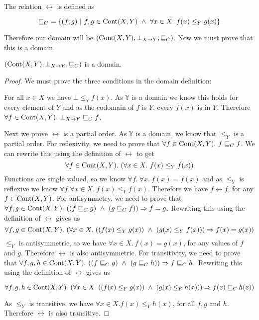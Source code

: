 The relation $\rel$ is defined as

\[ \sqsubseteq_{C}  \ = \{ (f , g) \ | \ f,g \in \operatorname{Cont}(X,Y) \ \wedge \ \forall x \in X. \ f(x) \leq_Y g(x)\} \]

Therefore our domain will be $(\operatorname{Cont}(X,Y), \bot_{X \to Y}, \sqsubseteq_C)$. Now we must prove that this is a domain.

\vspace{0.5cm}

\begin{lem}
$(\operatorname{Cont}(X,Y), \bot_{X \to Y}, \sqsubseteq_C)$ is a domain.
\end{lem}

\begin{proof}
We must prove the three conditions in the domain definition:

For all $x \in X$ we have $\bot \leq_Y f(x)$. As $\mathbb{Y}$ is a domain we know this holds for every element of $Y$ and as the codomain of $f$ is $Y$, every $f(x)$ is in $Y$. Therefore $\forall f \in \operatorname{Cont}(X,Y). \ \bot_{X \to Y} \sqsubseteq_{C} f$.

Next we prove $\rel$ is a partial order. As $\mathbb{Y}$ is a domain, we know that $\leq_Y$ is a partial order. For reflexivity, we need to prove that $\forall f \in \operatorname{Cont}(X,Y). \ f \sqsubseteq_{C} f$. We can rewrite this using the definition of $\rel$ to get 
\[\forall f \in \operatorname{Cont}(X,Y). \ (\forall x \in X. \ f(x) \leq_Y f(x))\]
 Functions are single valued, so we know $\forall f. \ \forall x. \ f(x) = f(x)$ and as $\leq_Y$ is reflexive we know $\forall f. \forall x \in X. \ f(x) \leq_Y f(x)$. Therefore we have $f \rel f$, for any $f \in \operatorname{Cont}(X,Y)$. For antisymmetry, we need to prove that $\forall f,g \in \operatorname{Cont}(X,Y). \ ((f \sqsubseteq_{C} g) \ \wedge \ (g \sqsubseteq_{C} f)) \Rightarrow f = g$. Rewriting this using the definition of $\rel$ gives us
 \[\forall f,g \in \cont(X,Y). \ (\forall x \in X. \ ((f(x) \leq_Y g(x)) \ \wedge \ (g(x) \leq_Y f(x))) \Rightarrow f(x) = g(x))\] 
 $\leq_Y$ is antisymmetric, so we have $\forall x \in X. \ f(x) = g(x)$, for any values of $f$ and $g$. Therefore $\rel$ is also antisymmetric. For transitivity, we need to prove that $\forall f,g,h \in \operatorname{Cont}(X,Y). \ ((f \sqsubseteq_{C} g) \  \wedge \ (g \sqsubseteq_{C} h)) \Rightarrow f \sqsubseteq_{C} h$. Rewriting this using the definition of $\rel$ gives us 

\[\forall f,g,h \in \operatorname{Cont}(X,Y). \ (\forall x \in X. \ ((f(x) \leq_Y g(x)) \ \wedge \ (g(x) \leq_Y h(x))) \Rightarrow f(x) \sqsubseteq_{C} h(x)) \]
 
As $\leq_Y$ is transitive, we have $\forall x \in X.f(x) \leq_Y h(x)$, for all $f, g$ and $h$. Therefore $\rel$ is also transitive. 


\end{proof}
